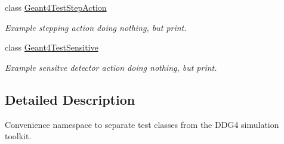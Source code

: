 \begin{DoxyCompactItemize}
class \hyperlink{class_d_d4hep_1_1_simulation_1_1_test_1_1_geant4_test_step_action}{Geant4TestStepAction}
\begin{DoxyCompactList}\small\item\em Example stepping action doing nothing, but print. \item\end{DoxyCompactList}\item 
class \hyperlink{class_d_d4hep_1_1_simulation_1_1_test_1_1_geant4_test_sensitive}{Geant4TestSensitive}
\begin{DoxyCompactList}\small\item\em Example sensitve detector action doing nothing, but print. \item\end{DoxyCompactList}\end{DoxyCompactItemize}


\subsection{Detailed Description}
Convenience namespace to separate test classes from the DDG4 simulation toolkit. 
